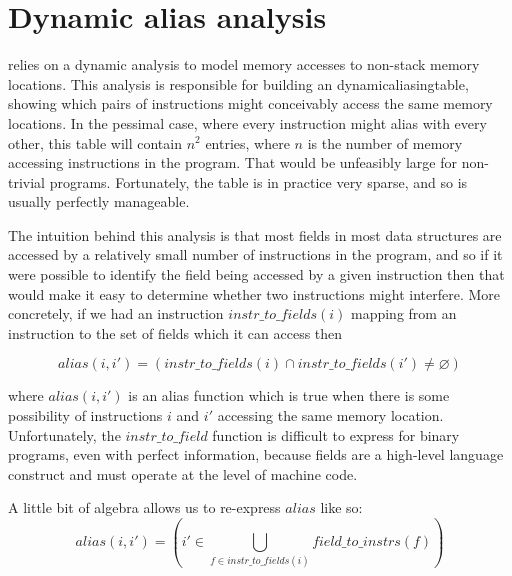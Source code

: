 \section{Dynamic alias analysis}
\label{sect:program_model:dynamic_alias}


{\Technique} relies on a dynamic analysis to model memory accesses to
non-stack memory locations.  This analysis is responsible for building
an \gls{dynamicaliasingtable}, showing which pairs of instructions
might conceivably access the same memory locations.  In the pessimal
case, where every instruction might alias with every other, this table
will contain $n^2$ entries, where $n$ is the number of memory
accessing instructions in the program.  That would be unfeasibly large
for non-trivial programs.  Fortunately, the table is in practice very
sparse, and so is usually perfectly manageable.


The intuition behind this analysis is that most fields in most data
structures are accessed by a relatively small number of instructions
in the program, and so if it were possible to identify the field being
accessed by a given instruction then that would make it easy to
determine whether two instructions might interfere.  More concretely,
if we had an instruction $\mathit{instr\_to\_fields}(i)$ mapping from
an instruction to the set of fields which it can access then

\begin{displaymath}
\mathit{alias}(i, i') = (\mathit{instr\_to\_fields}(i) \cap \mathit{instr\_to\_fields}(i') \not= \varnothing)
\end{displaymath}

where $\mathit{alias}(i, i')$ is an alias function which is true when
there is some possibility of instructions $i$ and $i'$ accessing the
same memory location.  Unfortunately, the $\mathit{instr\_to\_field}$
function is difficult to express for binary programs, even with
perfect information, because fields are a high-level language
construct and {\technique} must operate at the level of machine code.

A little bit of algebra allows us to re-express $\mathit{alias}$ like
so:
\begin{displaymath}
\mathit{alias}(i, i') = \left(i' \in \bigcup_{f \in \mathit{instr\_to\_fields}(i)} \mathit{field\_to\_instrs}(f)\right)
\end{displaymath}

